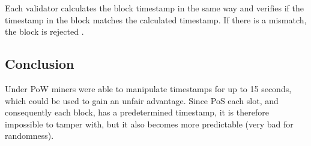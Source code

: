 Each validator calculates the block timestamp in the same way and verifies if
the timestamp in the block matches the calculated timestamp. If there is a
mismatch, the block is rejected \cite{process-execution-payload}.

\subsection{Conclusion}

Under PoW miners were able to manipulate timestamps for up to 15 seconds, which
could be used to gain an unfair advantage. Since PoS each slot, and
consequently each block, has a predetermined timestamp, it is
therefore impossible to tamper with, but it also becomes more predictable (very
bad for randomness).

